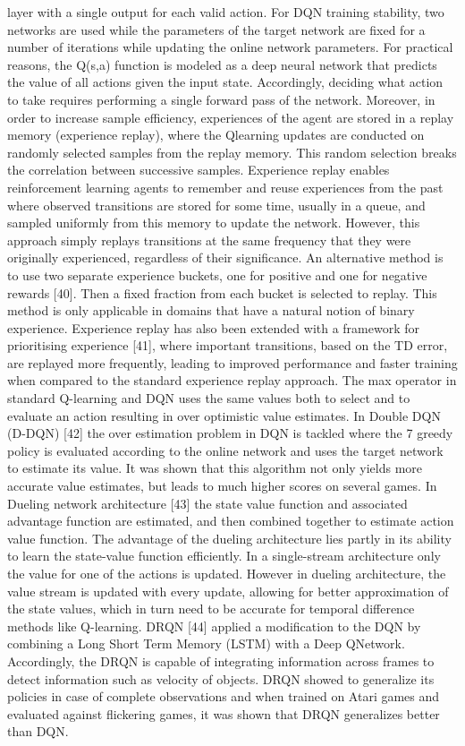 layer with a single output for each valid action. For DQN
training stability, two networks are used while the parameters
of the target network are fixed for a number of iterations while
updating the online network parameters. For practical reasons,
the Q(s,a) function is modeled as a deep neural network
that predicts the value of all actions given the input state.
Accordingly, deciding what action to take requires performing
a single forward pass of the network. Moreover, in order
to increase sample efficiency, experiences of the agent are
stored in a replay memory (experience replay), where the Qlearning updates are conducted on randomly selected samples
from the replay memory. This random selection breaks the
correlation between successive samples. Experience replay
enables reinforcement learning agents to remember and reuse
experiences from the past where observed transitions are stored
for some time, usually in a queue, and sampled uniformly from
this memory to update the network. However, this approach
simply replays transitions at the same frequency that they were
originally experienced, regardless of their significance. An
alternative method is to use two separate experience buckets,
one for positive and one for negative rewards [40]. Then a fixed
fraction from each bucket is selected to replay. This method
is only applicable in domains that have a natural notion of
binary experience. Experience replay has also been extended
with a framework for prioritising experience [41], where
important transitions, based on the TD error, are replayed
more frequently, leading to improved performance and faster
training when compared to the standard experience replay
approach.
The max operator in standard Q-learning and DQN uses the
same values both to select and to evaluate an action resulting
in over optimistic value estimates. In Double DQN (D-DQN)
[42] the over estimation problem in DQN is tackled where the
7
greedy policy is evaluated according to the online network and
uses the target network to estimate its value. It was shown that
this algorithm not only yields more accurate value estimates,
but leads to much higher scores on several games.
In Dueling network architecture [43] the state value function
and associated advantage function are estimated, and then
combined together to estimate action value function. The
advantage of the dueling architecture lies partly in its ability
to learn the state-value function efficiently. In a single-stream
architecture only the value for one of the actions is updated.
However in dueling architecture, the value stream is updated
with every update, allowing for better approximation of the
state values, which in turn need to be accurate for temporal
difference methods like Q-learning.
DRQN [44] applied a modification to the DQN by combining a Long Short Term Memory (LSTM) with a Deep QNetwork. Accordingly, the DRQN is capable of integrating information across frames to detect information such as velocity
of objects. DRQN showed to generalize its policies in case of
complete observations and when trained on Atari games and
evaluated against flickering games, it was shown that DRQN
generalizes better than DQN.